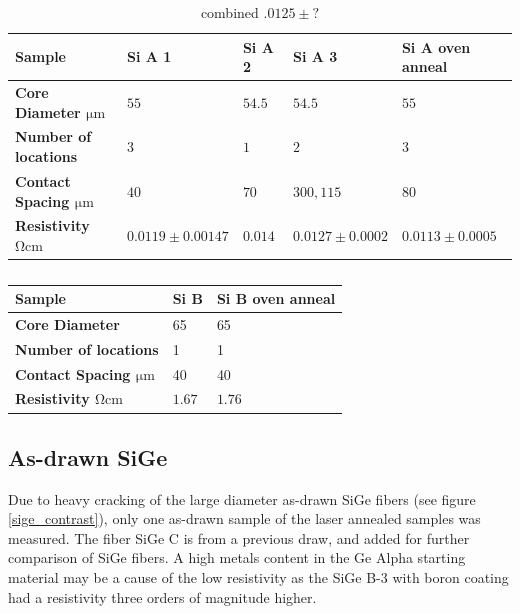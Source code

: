 \begin{table}[!h]
\begin{center}
\begin{tabular}{ | l | l | l | l |l|}
\hline
\textbf{Sample}& Si A 1 & Si A 2 & Si A 3 & Si A oven anneal\\ \hline
\textbf{Core Diameter $\si{\micro \meter}$} &$55$& $54.5$&$54.5$ &$55$\\\hline
\textbf{Number of locations}                &$3$&  $1$& $2$&$3$\\\hline
\textbf{Contact Spacing $\si{\micro \meter}$}&$40$& $70$&$ 300, 115$&$80$\\\hline
\textbf{Resistivity $\si{\ohm \cm}$}& $0.0119 \pm 0.00147$ &  $0.014$&$0.0127 \pm 0.0002$& $0.0113 \pm 0.0005$ \\\hline
\end{tabular}
\end{center}
\caption{combined $.0125 \pm ?$}
\label{si_A}
\end{table}

\begin{table}[!h]
\begin{center}
\begin{tabular}{ | l | l |l|}
\hline
\textbf{Sample}& Si B  &  Si B oven anneal\\ \hline
\textbf{Core Diameter}  & 65 & 65 \\ \hline
\textbf{Number of locations}&        1&1 \\ \hline
\textbf{Contact Spacing $\si{\micro \meter}$} &40 & 40 \\ \hline
\textbf{Resistivity $\si{\ohm \cm}$} &$1.67$ & $1.76$ \\ \hline
\end{tabular}
\end{center}
\caption{}
\label{si_B}
\end{table}


\subsection{As-drawn SiGe}
Due to heavy cracking of the large diameter as-drawn SiGe fibers (see figure \ref{sige_contrast}), only one as-drawn sample of the laser annealed samples was measured. The fiber SiGe C is from a previous draw, and added for further comparison of SiGe fibers. A high metals content in the Ge Alpha starting material may be a cause of the low resistivity as the SiGe B-3 with boron coating had a resistivity three orders of magnitude higher.  


